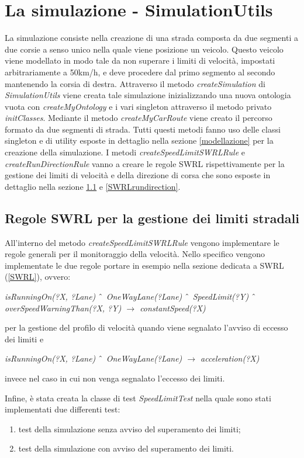 \section{La simulazione - SimulationUtils}
La simulazione consiste nella creazione di una strada composta da due segmenti a due corsie a senso unico nella quale viene posizione un veicolo.
Questo veicolo viene modellato in modo tale da non superare i limiti di velocit\`a, impostati arbitrariamente a 50km/h, e deve procedere dal primo segmento al secondo mantenendo la corsia di destra.
Attraverso il metodo \textit{createSimulation} di \textit{SimulationUtils} viene creata tale simulazione inizializzando una nuova ontologia vuota con \textit{createMyOntology} e i vari singleton attraverso il metodo privato \textit{initClasses}.
Mediante il metodo \textit{createMyCarRoute} viene creato il percorso formato da due segmenti di strada.
Tutti questi metodi fanno uso delle classi singleton e di utility esposte in dettaglio nella sezione \ref{modellazione} per la creazione della simulazione.
I metodi \textit{createSpeedLimitSWRLRule} e \textit{createRunDirectionRule} vanno a creare le regole SWRL rispettivamente per la gestione dei limiti di velocit\`a e della direzione di corsa che sono esposte in dettaglio nella sezione \ref{SWRLspeedlimit} e \ref{SWRLrundirection}.
\subsection{Regole SWRL per la gestione dei limiti stradali}\label{SWRLspeedlimit}
All'interno del metodo \textit{createSpeedLimitSWRLRule} vengono implementare le regole generali per il monitoraggio della velocit\`a. Nello specifico vengono implementate le due regole portare in esempio nella sezione dedicata a SWRL (\ref{SWRL}), ovvero:
\begin{center}
\emph{isRunningOn(?X, ?Lane) $\char`\^$ OneWayLane(?Lane) $\char`\^$ SpeedLimit(?Y) $\char`\^$ overSpeedWarningThan(?X, ?Y) $\rightarrow$ constantSpeed(?X)}\\
\end{center}
per la gestione del profilo di velocit\`a quando viene segnalato l'avviso di eccesso dei limiti e
\begin{center}
\emph{isRunningOn(?X, ?Lane) $\char`\^$ OneWayLane(?Lane) $\rightarrow$ acceleration(?X)}\\
\end{center}
invece nel caso in cui non venga segnalato l'eccesso dei limiti.

Infine, \`e stata creata la classe di test \textit{SpeedLimitTest} nella quale sono stati implementati due differenti test:
\begin{enumerate}
\item test della simulazione senza avviso del superamento dei limiti;
\item test della simulazione con avviso del superamento dei limiti.
\end{enumerate}
